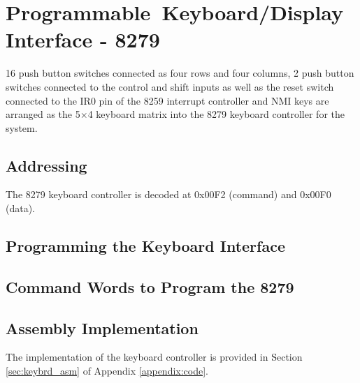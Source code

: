 \section{Programmable Keyboard/Display Interface - 8279}
16 push button switches connected as four rows and four columns, 2 push button switches connected to the control and shift inputs as well as the reset switch connected to the IR0 pin of the 8259 interrupt controller and NMI keys are arranged as the 5$\times$4 keyboard matrix into the 8279 keyboard controller for the system.

    \subsection{Addressing}
    The 8279 keyboard controller is decoded at 0x00F2 (command) and 0x00F0 (data).

    \subsection{Programming the Keyboard Interface}

    \subsection{Command Words to Program the 8279}

    \subsection{Assembly Implementation}
    The implementation of the keyboard controller is provided in Section \ref{sec:keybrd_asm} of Appendix \ref{appendix:code}.
